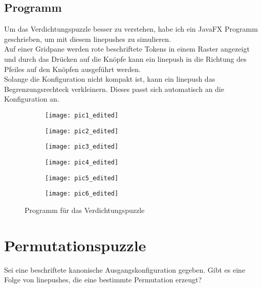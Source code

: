 \documentclass[seminar,german]{algothesis}
\begin{document}
\subsection{Programm}
Um das Verdichtungspuzzle besser zu verstehen, habe ich ein JavaFX Programm geschrieben, um mit diesem linepushes zu simulieren. \\
Auf einer Gridpane werden rote beschriftete Tokens in einem Raster angezeigt und durch das Drücken auf die Knöpfe kann ein linepush in die Richtung des Pfeiles auf den Knöpfen ausgeführt werden.\\
Solange die Konfiguration nicht kompakt ist, kann ein linepush das Begrenzungsrechteck verkleinern. Dieses passt sich automatisch an die Konfiguration an.
\begin{figure}
	\centering
	\begin{subfigure}{.5\textwidth}
		\texttt{[image: pic1\_edited]}
    \end{subfigure}%
    \begin{subfigure}{.5\textwidth}
		\texttt{[image: pic2\_edited]}
    \end{subfigure}
\end{figure}
\begin{figure}
	\centering
	\begin{subfigure}{.5\textwidth}
		\texttt{[image: pic3\_edited]}
    \end{subfigure}%
    \begin{subfigure}{.5\textwidth}
		\texttt{[image: pic4\_edited]}
    \end{subfigure}
\end{figure}
\begin{figure}
	\centering
	\begin{subfigure}{.5\textwidth}
		\texttt{[image: pic5\_edited]}
    \end{subfigure}%
    \begin{subfigure}{.5\textwidth}
		\texttt{[image: pic6\_edited]}
    \end{subfigure}
    \caption{Programm für das Verdichtungspuzzle}
	\label{fig:6}
\end{figure}

\newpage

\section{Permutationspuzzle}
Sei eine beschriftete kanonische Ausgangskonfiguration gegeben. Gibt es eine Folge von linepushes, die eine bestimmte Permutation erzeugt? 
\end{document}

